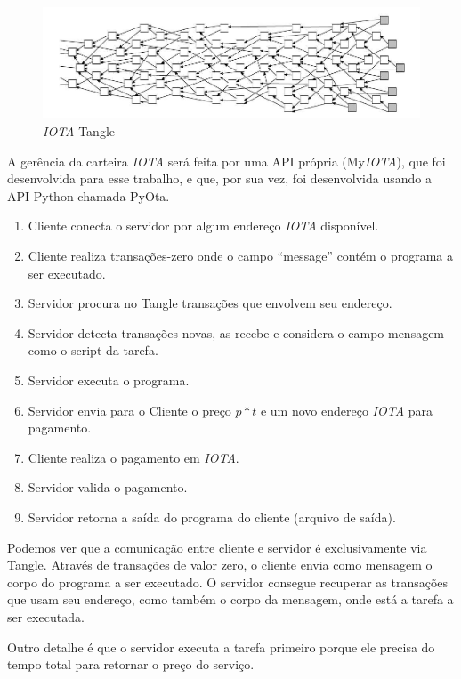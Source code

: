 \documentclass[a4paper]{article}
\begin{document}
\begin{figure}[!htb]
\centering
\includegraphics[scale=0.3]{tangle.jpg}
\caption{\textit{IOTA} Tangle}
\label{fig:tangle}
\end{figure}

A gerência da carteira \textit{IOTA} será feita por uma API própria (My\textit{IOTA}), que foi desenvolvida para esse trabalho, e que, por sua vez, foi
desenvolvida usando a API Python chamada PyOta.

\begin{enumerate}
\item Cliente conecta o servidor por algum endereço \textit{IOTA} disponível.
\item Cliente realiza transações-zero onde o campo ``message'' contém o programa a ser executado.
\item Servidor procura no Tangle transações que envolvem seu endereço.
\item Servidor detecta transações novas, as recebe e considera o campo mensagem como o script da tarefa.
\item Servidor executa o programa.
\item Servidor envia para o Cliente o preço $p*t$ e um novo endereço \textit{IOTA} para pagamento.
\item Cliente realiza o pagamento em \textit{IOTA}.
\item Servidor valida o pagamento.
\item Servidor retorna a saída do programa do cliente (arquivo de saída).
\end{enumerate}

Podemos ver que a comunicação entre cliente e servidor é exclusivamente via Tangle. Através de transações de valor zero, o cliente
envia como mensagem o corpo do programa a ser executado. O servidor consegue recuperar as transações que usam seu endereço, como
também o corpo da mensagem, onde está a tarefa a ser executada.

Outro detalhe é que o servidor executa a tarefa primeiro porque ele precisa do tempo total para retornar o preço do serviço.
\end{document}
